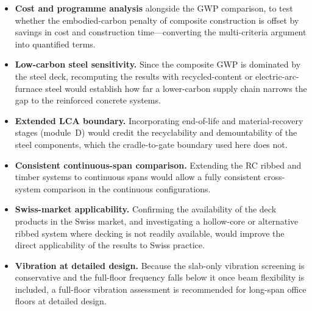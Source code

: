 \begin{itemize}
    \item \textbf{Cost and programme analysis} alongside the GWP comparison, to test whether the embodied-carbon penalty of composite construction is offset by savings in cost and construction time---converting the multi-criteria argument into quantified terms.
    \item \textbf{Low-carbon steel sensitivity.} Since the composite GWP is dominated by the steel deck, recomputing the results with recycled-content or electric-arc-furnace steel would establish how far a lower-carbon supply chain narrows the gap to the reinforced concrete systems.
    \item \textbf{Extended LCA boundary.} Incorporating end-of-life and material-recovery stages (module~D) would credit the recyclability and demountability of the steel components, which the cradle-to-gate boundary used here does not.
    \item \textbf{Consistent continuous-span comparison.} Extending the RC ribbed and timber systems to continuous spans would allow a fully consistent cross-system comparison in the continuous configurations.
    \item \textbf{Swiss-market applicability.} Confirming the availability of the deck products in the Swiss market, and investigating a hollow-core or alternative ribbed system where decking is not readily available, would improve the direct applicability of the results to Swiss practice.
    \item \textbf{Vibration at detailed design.} Because the slab-only vibration screening is conservative and the full-floor frequency falls below it once beam flexibility is included, a full-floor vibration assessment is recommended for long-span office floors at detailed design.
\end{itemize}

